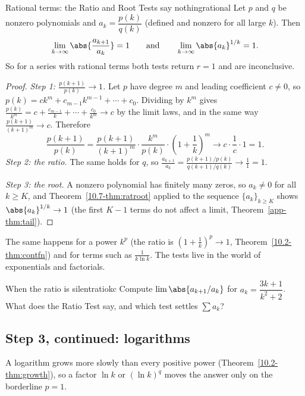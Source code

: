 \documentclass[11pt]{article}
\begin{document}
\begin{thm}{Rational terms: the Ratio and Root Tests say nothing}{rational}
Let $p$ and $q$ be nonzero polynomials and $a_k=\dfrac{p(k)}{q(k)}$ (defined and nonzero for all large $k$). Then
\[
\lim_{k\to\infty}\abs{\frac{a_{k+1}}{a_k}}=1\qquad\text{and}\qquad\lim_{k\to\infty}\abs{a_k}^{1/k}=1 .
\]
So for a series with rational terms both tests return $r=1$ and are inconclusive.
\end{thm}
\begin{proof}
\emph{Step 1: $\frac{p(k+1)}{p(k)}\to1$.} Let $p$ have degree $m$ and leading coefficient $c\ne0$, so $p(k)=ck^m+c_{m-1}k^{m-1}+\cdots+c_0$. Dividing by $k^m$ gives $\frac{p(k)}{k^m}=c+\frac{c_{m-1}}k+\cdots+\frac{c_0}{k^m}\to c$ by the limit laws, and in the same way $\frac{p(k+1)}{(k+1)^m}\to c$. Therefore
\[
\frac{p(k+1)}{p(k)}=\frac{p(k+1)}{(k+1)^m}\cdot\frac{k^m}{p(k)}\cdot\left(1+\frac1k\right)^m\to c\cdot\frac1c\cdot1=1 .
\]
\emph{Step 2: the ratio.} The same holds for $q$, so $\frac{a_{k+1}}{a_k}=\frac{p(k+1)/p(k)}{q(k+1)/q(k)}\to\frac11=1$.

\emph{Step 3: the root.} A nonzero polynomial has finitely many zeros, so $a_k\ne0$ for all $k\ge K$, and Theorem~\ref{10.7-thm:ratroot} applied to the sequence $\{a_k\}_{k\ge K}$ shows $\abs{a_k}^{1/k}\to1$ (the first $K-1$ terms do not affect a limit, Theorem~\ref{app-thm:tail}).
\end{proof}

The same happens for a power $k^p$ (the ratio is $\left(1+\frac1k\right)^p\to1$, Theorem~\ref{10.2-thm:contfn}) and for terms such as $\frac1{k\ln k}$. The tests live in the world of exponentials and factorials.

\begin{kc}{When the ratio is silent}{ratiokc}
Compute $\lim\abs{a_{k+1}/a_k}$ for $a_k=\dfrac{3k+1}{k^2+2}$. What does the Ratio Test say, and which test settles $\sum a_k$?
\end{kc}

\subsection*{Step 3, continued: logarithms}

A logarithm grows more slowly than every positive power (Theorem~\ref{10.2-thm:growth}), so a factor $\ln k$ or $(\ln k)^q$ moves the answer only on the borderline $p=1$.
\end{document}
